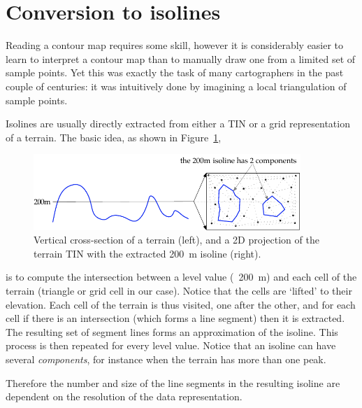 %
\section{Conversion to isolines}%
\label{sec:iso}

Reading a contour map requires some skill, however it is considerably easier to learn to interpret a contour map than to manually draw one from a limited set of sample points.
Yet this was exactly the task of many cartographers in the past couple of centuries: it was intuitively done by imagining a local triangulation of sample points. 

%

Isolines are usually directly extracted from either a TIN or a grid representation of a terrain. 
The basic idea, as shown in Figure~\ref{fig:isolineidea},
\begin{figure}
  \centering
  \includegraphics[width=0.9\textwidth]{figs/isoline}
  \caption{Vertical cross-section of a terrain (left), and a 2D projection of the terrain TIN with the extracted \qty{200}{\m} isoline (right).}%
\label{fig:isolineidea}
\end{figure}
is to compute the intersection between a level value (\eg\ \qty{200}{\m}) and each cell of the terrain (triangle or grid cell in our case).
Notice that the cells are `lifted' to their elevation.  
Each cell of the terrain is thus visited, one after the other, and for each cell if there is an intersection (which forms a line segment) then it is extracted.
The resulting set of segment lines forms an approximation of the isoline.
This process is then repeated for every level value.
Notice that an isoline can have several \emph{components}, for instance when the terrain has more than one peak.

Therefore the number and size of the line segments in the resulting isoline are dependent on the resolution of the data representation. 

